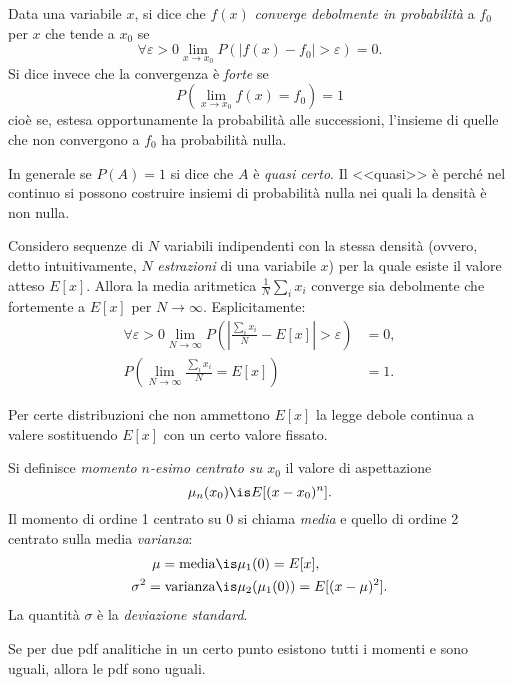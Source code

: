 \begin{definition}
	Data una variabile $x$, si dice che $f(x)$ \emph{converge debolmente in probabilità} a $f_0$ per $x$ che tende a $x_0$ se
	\begin{equation*}
		\forall\varepsilon > 0 \lim_{x\to x_0} P\left( \left| f(x) - f_0 \right| > \varepsilon \right) = 0.
	\end{equation*}
	Si dice invece che la convergenza è \emph{forte} se
	\begin{equation*}
		P\left( \lim_{x\to x_0} f(x) = f_0 \right) = 1
	\end{equation*}
	cioè se, estesa opportunamente la probabilità alle successioni, l'insieme di quelle che non convergono a $f_0$ ha probabilità nulla.
\end{definition}

In generale se $P(A)=1$ si dice che $A$ è \emph{quasi certo}. Il <<quasi>> è perché nel continuo si possono costruire insiemi di probabilità nulla nei quali la densità è non nulla.

\begin{fact}
	\label{th:grossnum}
	Considero sequenze di $N$ variabili indipendenti con la stessa densità (ovvero, detto intuitivamente, $N$ \emph{estrazioni} di una variabile $x$) per la quale esiste il valore atteso $E[x]$.
	Allora la media aritmetica $\frac1N\sum_ix_i$ converge sia debolmente che fortemente a $E[x]$ per $N\to\infty$.
	Esplicitamente:
	\begin{align*}
		\forall\varepsilon > 0 \lim_{N\to \infty} P\left( \left| \frac{\sum_ix_i}N - E[x] \right| > \varepsilon \right) &= 0, \\
		P\left( \lim_{N\to \infty} \frac{\sum_ix_i}N = E[x] \right) &= 1.
	\end{align*}
\end{fact}

\noindent Per certe distribuzioni che non ammettono $E[x]$ la legge debole continua a valere sostituendo $E[x]$ con un certo valore fissato.

\begin{definition}[Momenti]
	Si definisce \emph{momento $n$-esimo centrato su $x_0$} il valore di aspettazione
	\begin{equation*}
		\mu_n(x_0) \is E[(x - x_0)^n].
	\end{equation*}
	Il momento di ordine 1 centrato su 0 si chiama \emph{media} e quello di ordine 2 centrato sulla media \emph{varianza}:
	\begin{align*}
		\mu = \text{media} &\is \mu_1(0) = E[x], \\
		\sigma^2 = \text{varianza} &\is \mu_2(\mu_1(0)) = E[(x-\mu)^2].
	\end{align*}
	La quantità $\sigma$ è la \emph{deviazione standard}.
\end{definition}

\begin{fact}
	\label{th:pdfmom}
	Se per due pdf analitiche in un certo punto esistono tutti i momenti e sono uguali, allora le pdf sono uguali.
\end{fact}
